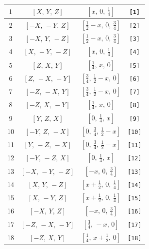 \documentclass[fleqn,8pt]{jsarticle}
\begin{document}
\begin{longtable}{cccc}
1 & $\left[ X,\, Y,\, Z \right]$ & $\left[ x,\, 0,\, \frac{1}{4} \right]$ & {\tt [1]} \\ \hline
2 & $\left[ - X,\, - Y,\, Z \right]$ & $\left[ \frac{1}{2} - x,\, 0,\, \frac{3}{4} \right]$ & {\tt [2]} \\ \hline
3 & $\left[ - X,\, Y,\, - Z \right]$ & $\left[ \frac{1}{2} - x,\, 0,\, \frac{3}{4} \right]$ & {\tt [3]} \\ \hline
4 & $\left[ X,\, - Y,\, - Z \right]$ & $\left[ x,\, 0,\, \frac{1}{4} \right]$ & {\tt [4]} \\ \hline
5 & $\left[ Z,\, X,\, Y \right]$ & $\left[ \frac{1}{4},\, x,\, 0 \right]$ & {\tt [5]} \\ \hline
6 & $\left[ Z,\, - X,\, - Y \right]$ & $\left[ \frac{3}{4},\, \frac{1}{2} - x,\, 0 \right]$ & {\tt [6]} \\ \hline
7 & $\left[ - Z,\, - X,\, Y \right]$ & $\left[ \frac{3}{4},\, \frac{1}{2} - x,\, 0 \right]$ & {\tt [7]} \\ \hline
8 & $\left[ - Z,\, X,\, - Y \right]$ & $\left[ \frac{1}{4},\, x,\, 0 \right]$ & {\tt [8]} \\ \hline
9 & $\left[ Y,\, Z,\, X \right]$ & $\left[ 0,\, \frac{1}{4},\, x \right]$ & {\tt [9]} \\ \hline
10 & $\left[ - Y,\, Z,\, - X \right]$ & $\left[ 0,\, \frac{3}{4},\, \frac{1}{2} - x \right]$ & {\tt [10]} \\ \hline
11 & $\left[ Y,\, - Z,\, - X \right]$ & $\left[ 0,\, \frac{3}{4},\, \frac{1}{2} - x \right]$ & {\tt [11]} \\ \hline
12 & $\left[ - Y,\, - Z,\, X \right]$ & $\left[ 0,\, \frac{1}{4},\, x \right]$ & {\tt [12]} \\ \hline
13 & $\left[ - X,\, - Y,\, - Z \right]$ & $\left[ - x,\, 0,\, \frac{3}{4} \right]$ & {\tt [13]} \\ \hline
14 & $\left[ X,\, Y,\, - Z \right]$ & $\left[ x + \frac{1}{2},\, 0,\, \frac{1}{4} \right]$ & {\tt [14]} \\ \hline
15 & $\left[ X,\, - Y,\, Z \right]$ & $\left[ x + \frac{1}{2},\, 0,\, \frac{1}{4} \right]$ & {\tt [15]} \\ \hline
16 & $\left[ - X,\, Y,\, Z \right]$ & $\left[ - x,\, 0,\, \frac{3}{4} \right]$ & {\tt [16]} \\ \hline
17 & $\left[ - Z,\, - X,\, - Y \right]$ & $\left[ \frac{3}{4},\, - x,\, 0 \right]$ & {\tt [17]} \\ \hline
18 & $\left[ - Z,\, X,\, Y \right]$ & $\left[ \frac{1}{4},\, x + \frac{1}{2},\, 0 \right]$ & {\tt [18]} \\ \hline

\end{longtable}
\end{document}
